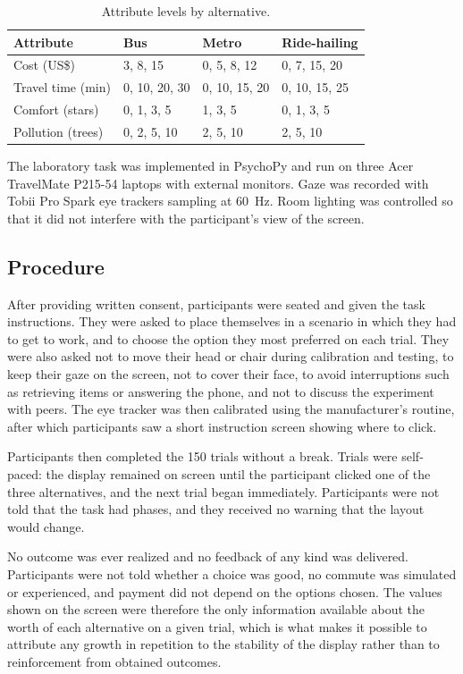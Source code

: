 \documentclass[man,natbib,floatsintext]{apa7}
\begin{document}
\begin{table}[H]
\centering
\caption{Attribute levels by alternative.}
\label{tab:levels}
\begin{tabular}{llll}
\toprule
Attribute & Bus & Metro & Ride-hailing \\
\midrule
Cost (US\$) & 3, 8, 15 & 0, 5, 8, 12 & 0, 7, 15, 20 \\
Travel time (min) & 0, 10, 20, 30 & 0, 10, 15, 20 & 0, 10, 15, 25 \\
Comfort (stars) & 0, 1, 3, 5 & 1, 3, 5 & 0, 1, 3, 5 \\
Pollution (trees) & 0, 2, 5, 10 & 2, 5, 10 & 2, 5, 10 \\
\bottomrule
\end{tabular}
\end{table}

The laboratory task was implemented in PsychoPy and run on three Acer TravelMate P215-54 laptops with external monitors. Gaze was recorded with Tobii Pro Spark eye trackers sampling at 60~Hz. Room lighting was controlled so that it did not interfere with the participant's view of the screen.

\subsection{Procedure}

After providing written consent, participants were seated and given the task instructions. They were asked to place themselves in a scenario in which they had to get to work, and to choose the option they most preferred on each trial. They were also asked not to move their head or chair during calibration and testing, to keep their gaze on the screen, not to cover their face, to avoid interruptions such as retrieving items or answering the phone, and not to discuss the experiment with peers. The eye tracker was then calibrated using the manufacturer's routine, after which participants saw a short instruction screen showing where to click.

Participants then completed the 150 trials without a break. Trials were self-paced: the display remained on screen until the participant clicked one of the three alternatives, and the next trial began immediately. Participants were not told that the task had phases, and they received no warning that the layout would change.

No outcome was ever realized and no feedback of any kind was delivered. Participants were not told whether a choice was good, no commute was simulated or experienced, and payment did not depend on the options chosen. The values shown on the screen were therefore the only information available about the worth of each alternative on a given trial, which is what makes it possible to attribute any growth in repetition to the stability of the display rather than to reinforcement from obtained outcomes.
\end{document}
